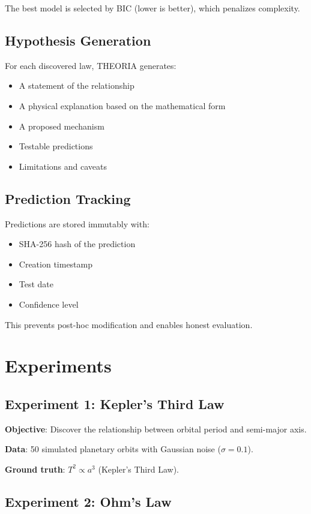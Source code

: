 \documentclass[journal,10pt]{IEEEtran}
\begin{document}
The best model is selected by BIC (lower is better), which penalizes complexity.

\subsection{Hypothesis Generation}

For each discovered law, THEORIA generates:
\begin{itemize}
\item A statement of the relationship
\item A physical explanation based on the mathematical form
\item A proposed mechanism
\item Testable predictions
\item Limitations and caveats
\end{itemize}

\subsection{Prediction Tracking}

Predictions are stored immutably with:
\begin{itemize}
\item SHA-256 hash of the prediction
\item Creation timestamp
\item Test date
\item Confidence level
\end{itemize}

This prevents post-hoc modification and enables honest evaluation.

\section{Experiments}

\subsection{Experiment 1: Kepler's Third Law}

\textbf{Objective}: Discover the relationship between orbital period and semi-major axis.

\textbf{Data}: 50 simulated planetary orbits with Gaussian noise ($\sigma = 0.1$).

\textbf{Ground truth}: $T^2 \propto a^3$ (Kepler's Third Law).

\subsection{Experiment 2: Ohm's Law}
\end{document}
